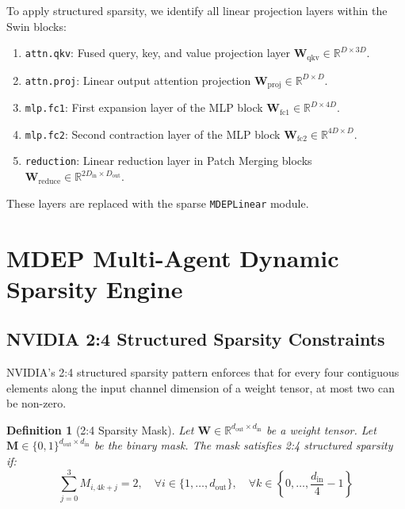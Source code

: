 \documentclass[11pt]{article}
\newtheorem{definition}{Definition}
\newcommand{\R}{\mathbb{R}}
\begin{document}
To apply structured sparsity, we identify all linear projection layers within the Swin blocks:
\begin{enumerate}
    \item \texttt{attn.qkv}: Fused query, key, and value projection layer $\bm{W}_{\text{qkv}} \in \R^{D \times 3D}$.
    \item \texttt{attn.proj}: Linear output attention projection $\bm{W}_{\text{proj}} \in \R^{D \times D}$.
    \item \texttt{mlp.fc1}: First expansion layer of the MLP block $\bm{W}_{\text{fc1}} \in \R^{D \times 4D}$.
    \item \texttt{mlp.fc2}: Second contraction layer of the MLP block $\bm{W}_{\text{fc2}} \in \R^{4D \times D}$.
    \item \texttt{reduction}: Linear reduction layer in Patch Merging blocks $\bm{W}_{\text{reduce}} \in \R^{2D_{\text{in}} \times D_{\text{out}}}$.
\end{enumerate}
These layers are replaced with the sparse \texttt{MDEPLinear} module.

\section{MDEP Multi-Agent Dynamic Sparsity Engine}\label{sec:mdep}

\subsection{NVIDIA 2:4 Structured Sparsity Constraints}\label{subsec:24sparsity}

NVIDIA's 2:4 structured sparsity pattern enforces that for every four contiguous elements along the input channel dimension of a weight tensor, at most two can be non-zero.

\begin{definition}[2:4 Sparsity Mask]
Let $\bm{W} \in \R^{d_{\text{out}} \times d_{\text{in}}}$ be a weight tensor. Let $\bm{M} \in \{0, 1\}^{d_{\text{out}} \times d_{\text{in}}}$ be the binary mask. The mask satisfies 2:4 structured sparsity if:
\begin{equation}\label{eq:24_def}
    \sum_{j=0}^{3} M_{i, 4k+j} = 2, \quad \forall i \in \{1, \dots, d_{\text{out}}\}, \quad \forall k \in \left\{0, \dots, \frac{d_{\text{in}}}{4} - 1\right\}
\end{equation}
\end{definition}
\end{document}

